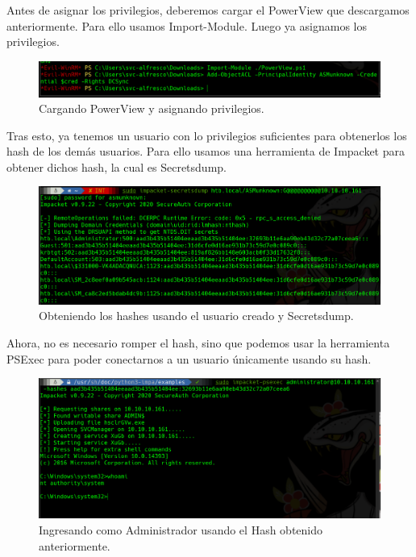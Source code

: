 \documentclass{article}
\begin{document}
Antes de asignar los privilegios, deberemos cargar el PowerView que descargamos anteriormente. Para ello usamos Import-Module. Luego ya asignamos los privilegios.

\begin{figure}[H]
	\center
	\includegraphics[width=\textwidth]{images/forest/importando el powerview.png}
	\caption{Cargando PowerView y asignando privilegios.}
\end{figure}

Tras esto, ya tenemos un usuario con lo privilegios suficientes para obtenerlos los hash de los demás usuarios. Para ello usamos una herramienta de Impacket para obtener dichos hash, la cual es Secretsdump.

\begin{figure}[H]
	\center
	\includegraphics[width=\textwidth]{images/forest/usando_secretsdump_hashes.png}
	\caption{Obteniendo los hashes usando el usuario creado y Secretsdump.}
\end{figure}

Ahora, no es necesario romper el hash, sino que podemos usar la herramienta PSExec para poder conectarnos a un usuario únicamente usando su hash.

\begin{figure}[H]
	\center
	\includegraphics[width=\textwidth]{images/forest/escalado_a_root.png}
	\caption{Ingresando como Administrador usando el Hash obtenido anteriormente.}
\end{figure}
\end{document}
